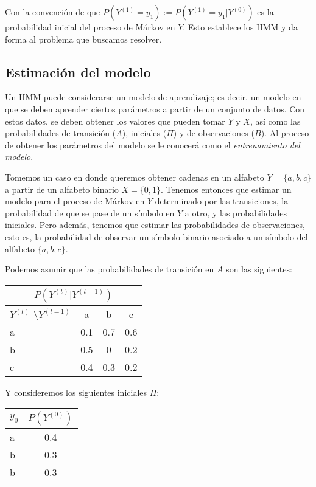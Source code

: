 Con la convención de que $P(Y^{(1)}=y_1) :=P(Y^{(1)}=y_1 | Y^{(0)})$ es la probabilidad inicial del proceso de Márkov en $Y$. Esto establece los HMM y da forma al problema que buscamos resolver.
    




\subsection{Estimación del modelo}

Un HMM puede considerarse un modelo de aprendizaje; es decir, un modelo en que se deben aprender ciertos parámetros a partir de un conjunto de datos. Con estos datos, se deben obtener los valores que pueden tomar $Y$ y $X$, así como las probabilidades de transición ($A$), iniciales ($\Pi$) y de observaciones ($B$). Al proceso de obtener los parámetros del modelo se le conocerá como el \emph{entrenamiento del modelo}.

Tomemos un caso en donde queremos obtener cadenas en un alfabeto $Y = \{a,b,c\}$ a partir de un alfabeto binario $X = \{0,1\}$. Tenemos entonces que estimar un modelo para el proceso de Márkov en $Y$ determinado por las transiciones, la probabilidad de que se pase de un símbolo en $Y$ a otro, y las probabilidades iniciales. Pero además, tenemos que estimar las probabilidades de observaciones, esto es, la probabilidad de observar un símbolo binario asociado a un símbolo del alfabeto $\{a,b,c\}$.

Podemos asumir que las probabilidades de transición en $A$ son las siguientes:

\begin{center}
 \begin{tabular}{l|ccc}
  \multicolumn{4}{c}{$P(Y^{(t)}|Y^{(t-1)})$} \\ \hline
  $Y^{(t)}$ \textbackslash $Y^{(t-1)}$          & a & b & c \\ \hline
  a &    0.1   &    0.7  & 0.6 \\
  b   &    0.5   &    0  & 0.2 \\
  c    &    0.4    &   0.3  & 0.2
 \end{tabular}
 \end{center}

Y consideremos los siguientes iniciales $\Pi$:

\begin{center}
 \begin{tabular}{l|c}
  \multicolumn{1}{c|}{$y_0$}   &  $P(Y^{(0)})$ \\ \hline
  a &    0.4 \\
  b   &    0.3 \\
  b    &    0.3
 \end{tabular}
 \end{center}

